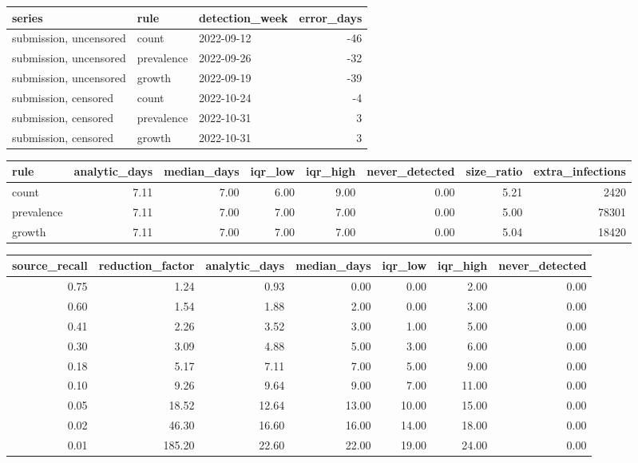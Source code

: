 \begin{tabular}{lllr}
\toprule
series & rule & detection\_week & error\_days \\
\midrule
submission, uncensored & count & 2022-09-12 & -46 \\
submission, uncensored & prevalence & 2022-09-26 & -32 \\
submission, uncensored & growth & 2022-09-19 & -39 \\
submission, censored & count & 2022-10-24 & -4 \\
submission, censored & prevalence & 2022-10-31 & 3 \\
submission, censored & growth & 2022-10-31 & 3 \\
\bottomrule
\end{tabular}


\begin{tabular}{lrrrrrrr}
\toprule
rule & analytic\_days & median\_days & iqr\_low & iqr\_high & never\_detected & size\_ratio & extra\_infections \\
\midrule
count & 7.11 & 7.00 & 6.00 & 9.00 & 0.00 & 5.21 & 2420 \\
prevalence & 7.11 & 7.00 & 7.00 & 7.00 & 0.00 & 5.00 & 78301 \\
growth & 7.11 & 7.00 & 7.00 & 7.00 & 0.00 & 5.04 & 18420 \\
\bottomrule
\end{tabular}


\begin{tabular}{rrrrrrr}
\toprule
source\_recall & reduction\_factor & analytic\_days & median\_days & iqr\_low & iqr\_high & never\_detected \\
\midrule
0.75 & 1.24 & 0.93 & 0.00 & 0.00 & 2.00 & 0.00 \\
0.60 & 1.54 & 1.88 & 2.00 & 0.00 & 3.00 & 0.00 \\
0.41 & 2.26 & 3.52 & 3.00 & 1.00 & 5.00 & 0.00 \\
0.30 & 3.09 & 4.88 & 5.00 & 3.00 & 6.00 & 0.00 \\
0.18 & 5.17 & 7.11 & 7.00 & 5.00 & 9.00 & 0.00 \\
0.10 & 9.26 & 9.64 & 9.00 & 7.00 & 11.00 & 0.00 \\
0.05 & 18.52 & 12.64 & 13.00 & 10.00 & 15.00 & 0.00 \\
0.02 & 46.30 & 16.60 & 16.00 & 14.00 & 18.00 & 0.00 \\
0.01 & 185.20 & 22.60 & 22.00 & 19.00 & 24.00 & 0.00 \\
\bottomrule
\end{tabular}


